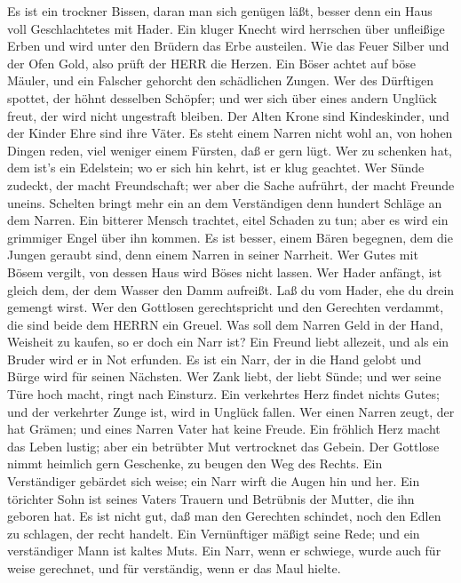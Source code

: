  Es ist ein trockner Bissen, daran man sich genügen läßt,
besser denn ein Haus voll Geschlachtetes mit Hader.  Ein
kluger Knecht wird herrschen über unfleißige Erben und wird unter den
Brüdern das Erbe austeilen.  Wie das Feuer Silber und der
Ofen Gold, also prüft der HERR die Herzen.  Ein Böser achtet
auf böse Mäuler, und ein Falscher gehorcht den schädlichen Zungen.
 Wer des Dürftigen spottet, der höhnt desselben Schöpfer;
und wer sich über eines andern Unglück freut, der wird nicht ungestraft
bleiben.  Der Alten Krone sind Kindeskinder, und der Kinder
Ehre sind ihre Väter.  Es steht einem Narren nicht wohl an,
von hohen Dingen reden, viel weniger einem Fürsten, daß er gern lügt.
 Wer zu schenken hat, dem ist's ein Edelstein; wo er sich
hin kehrt, ist er klug geachtet.  Wer Sünde zudeckt, der
macht Freundschaft; wer aber die Sache aufrührt, der macht Freunde
uneins.  Schelten bringt mehr ein an dem Verständigen denn
hundert Schläge an dem Narren.  Ein bitterer Mensch
trachtet, eitel Schaden zu tun; aber es wird ein grimmiger Engel über
ihn kommen.  Es ist besser, einem Bären begegnen, dem die
Jungen geraubt sind, denn einem Narren in seiner Narrheit. 
Wer Gutes mit Bösem vergilt, von dessen Haus wird Böses nicht lassen.
 Wer Hader anfängt, ist gleich dem, der dem Wasser den Damm
aufreißt. Laß du vom Hader, ehe du drein gemengt wirst. 
Wer den Gottlosen gerechtspricht und den Gerechten verdammt, die sind
beide dem HERRN ein Greuel.  Was soll dem Narren Geld in
der Hand, Weisheit zu kaufen, so er doch ein Narr ist?  Ein
Freund liebt allezeit, und als ein Bruder wird er in Not erfunden.
 Es ist ein Narr, der in die Hand gelobt und Bürge wird für
seinen Nächsten.  Wer Zank liebt, der liebt Sünde; und wer
seine Türe hoch macht, ringt nach Einsturz.  Ein verkehrtes
Herz findet nichts Gutes; und der verkehrter Zunge ist, wird in Unglück
fallen.  Wer einen Narren zeugt, der hat Grämen; und eines
Narren Vater hat keine Freude.  Ein fröhlich Herz macht das
Leben lustig; aber ein betrübter Mut vertrocknet das Gebein.
 Der Gottlose nimmt heimlich gern Geschenke, zu beugen den
Weg des Rechts.  Ein Verständiger gebärdet sich weise; ein
Narr wirft die Augen hin und her.  Ein törichter Sohn ist
seines Vaters Trauern und Betrübnis der Mutter, die ihn geboren hat.
 Es ist nicht gut, daß man den Gerechten schindet, noch den
Edlen zu schlagen, der recht handelt.  Ein Vernünftiger
mäßigt seine Rede; und ein verständiger Mann ist kaltes Muts.
 Ein Narr, wenn er schwiege, wurde auch für weise
gerechnet, und für verständig, wenn er das Maul hielte.

